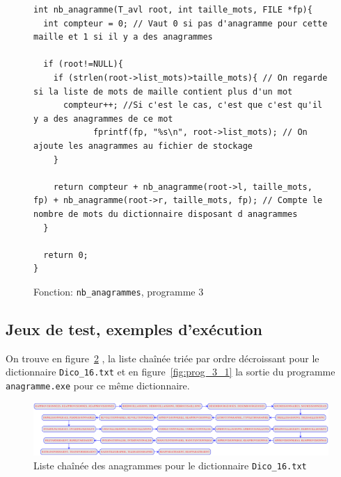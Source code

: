 \documentclass{article} %
\begin{document}
\begin{figure}[H]
  \begin{lstlisting}
int nb_anagramme(T_avl root, int taille_mots, FILE *fp){
  int compteur = 0; // Vaut 0 si pas d'anagramme pour cette maille et 1 si il y a des anagrammes

  if (root!=NULL){
    if (strlen(root->list_mots)>taille_mots){ // On regarde si la liste de mots de maille contient plus d'un mot
      compteur++; //Si c'est le cas, c'est que c'est qu'il y a des anagrammes de ce mot
            fprintf(fp, "%s\n", root->list_mots); // On ajoute les anagrammes au fichier de stockage
    }

    return compteur + nb_anagramme(root->l, taille_mots, fp) + nb_anagramme(root->r, taille_mots, fp); // Compte le nombre de mots du dictionnaire disposant d anagrammes
  }

  return 0;
}\end{lstlisting}
\caption{Fonction: \texttt{nb\_anagrammes}, programme 3}
\label{fig:nb_anag}
  
\end{figure}

\subsection{Jeux de test, exemples d'exécution}

On trouve en figure~\ref{fig:prog_3_2} , la liste chaînée triée par ordre décroissant pour le dictionnaire \texttt{Dico\_16.txt} et en figure~\ref{fig:prog_3_1} la sortie du programme \texttt{anagramme.exe} pour ce même dictionnaire.

\begin{figure}[H]
  \begin{center}
    \includegraphics[scale=0.28]{Img_prog3/liste_chaine.eps}
  \end{center}
  \caption{Liste chaînée des anagrammes pour le dictionnaire \texttt{Dico\_16.txt}}
  \label{fig:prog_3_2}
\end{figure}
\end{document}
